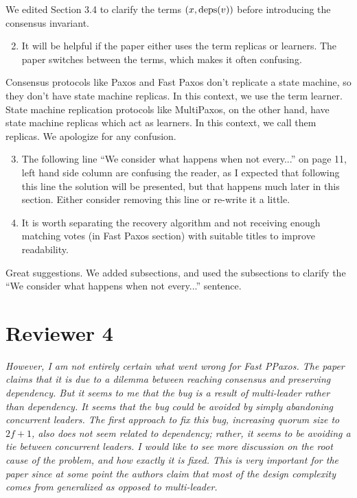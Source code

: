 \documentclass[letterpaper,twocolumn,10pt]{article}
\newenvironment{reviewerquote}
{\list{}{\leftmargin=\parindent\rightmargin=0in}\item[] \itshape \color{ReviewerDarkGray}}%
{\endlist}
\begin{document}
We edited Section 3.4 to clarify the terms $(x, \text{deps}(v))$ before introducing
the consensus invariant.

\begin{reviewerquote}
  \begin{enumerate}
    \setcounter{enumi}{1}
    \item
      It will be helpful if the paper either uses the term replicas or learners.
      The paper switches between the terms, which makes it often confusing.
  \end{enumerate}
\end{reviewerquote}

Consensus protocols like Paxos and Fast Paxos don't replicate a state machine,
so they don't have state machine replicas. In this context, we use the term
learner. State machine replication protocols like MultiPaxos, on the other
hand, have state machine replicas which act as learners. In this context, we
call them replicas. We apologize for any confusion.

\begin{reviewerquote}
  \begin{enumerate}
    \setcounter{enumi}{2}
    \item
      The following line ``We consider what happens when not every...'' on page
      11, left hand side column are confusing the reader, as I expected that
      following this line the solution will be presented, but that happens much
      later in this section. Either consider removing this line or re-write it a
      little.
    \item
      It is worth separating the recovery algorithm and not receiving enough
      matching votes (in Fast Paxos section) with suitable titles to improve
      readability.
  \end{enumerate}
\end{reviewerquote}

Great suggestions. We added subsections, and used the subsections to clarify
the ``We consider what happens when not every...'' sentence.

\section*{Reviewer 4}
\begin{reviewerquote}
  However, I am not entirely certain what went wrong for Fast PPaxos. The paper
  claims that it is due to a dilemma between reaching consensus and preserving
  dependency. But it seems to me that the bug is a result of multi-leader
  rather than dependency. It seems that the bug could be avoided by simply
  abandoning concurrent leaders. The first approach to fix this bug, increasing
  quorum size to $2f+1$, also does not seem related to dependency; rather, it
  seems to be avoiding a tie between concurrent leaders. I would like to see
  more discussion on the root cause of the problem, and how exactly it is
  fixed. This is very important for the paper since at some point the authors
  claim that most of the design complexity comes from generalized as opposed to
  multi-leader.
\end{reviewerquote}
\end{document}
